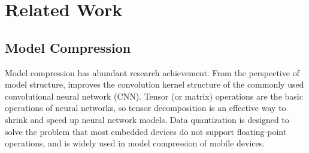 \documentclass[conference]{IEEEtran}
\begin{document}
	\section{Related Work}
	\begin{comment}
		\subsection{Acoustic scene classification}
		The prestigious detection and classification of acoustic scene and events
		(DCASE)\cite{RN200} challenge covers state-of-the-art techniques for classifying acoustic environmental noise.\\ 
		\cite{2019}\cite{10.1145/3485730.3493448}\cite{Hannun2014DeepSS} both use data
		augmentation to expand the training set to bring larger samples for model
		training.
		\cite{2019} focuses on improving model performance on the data, demonstrating
		the importance of data preprocessing for embedded machine learning performance.
		From a data-centric perspective, \cite{10.1145/3485730.3493448} proves that the
		parameter setting of data preprocessing has a certain impact on model
		fairness.\\
		In recent years, research in acoustic scene classification has focused on CNN
		network\cite{electronics10040371}, especially ResNet\cite{he2015deep} and
		DenseNet\cite{huang2018densely}.
		They have excellent performance in the field of image processing, but due to the
		characteristics of the acoustic scene, if the resnet is directly applied to
		them, the network performance will be greatly reduced.
		\cite{Kim2021BroadcastedRL} proves this, and proposes to use 1D and 2D
		convolution in speech data at the same time, extending the time output to the
		frequency time dimension. \cite{koutini2019receptive} proves the effect of
		receptive field on generalization ability in acoustic scene classification
		problem.
	\end{comment}
	
	\subsection{Model Compression}
	Model compression has abundant research achievement\cite{9043731}. From the
	perspective of model structure, \cite{szegedy2015rethinking}\cite{wu2017shift}
	improves the convolution kernel structure of the commonly used convolutional
	neural network (CNN). \cite{1102314}Tensor (or matrix) operations are the basic
	operations of neural networks, so tensor decomposition is an effective way to
	shrink and speed up neural network models.
	\cite{10.5555/2969442.2969588}\cite{6986082}\cite{deng2018gxnornet}Data
	quantization is designed to solve the problem that most embedded devices do not
	support floating-point operations, and is widely used in model compression of
	mobile devices.
	
\end{document}
